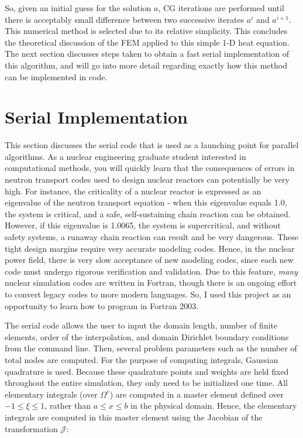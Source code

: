 \documentclass[10pt]{article}
\begin{document}
So, given an initial guess for the solution \(a\), CG iterations are performed until there is acceptably small difference between two successive iterates \(a^i\) and \(a^{i+1}\). This numerical method is selected due to its relative simplicity. This concludes the theoretical discussion of the FEM applied to this simple 1-D heat equation. The next section discusses steps taken to obtain a fast serial implementation of this algorithm, and will go into more detail regarding exactly how this method can be implemented in code.

\section{Serial Implementation}

This section discusses the serial code that is used as a launching point for parallel algorithms. As a nuclear engineering graduate student interested in computational methods, you will quickly learn that the consequences of errors in neutron transport codes used to design nuclear reactors can potentially be very high. For instance, the criticality of a nuclear reactor is expressed as an eigenvalue of the neutron transport equation - when this eigenvalue equals 1.0, the system is critical, and a safe, self-sustaining chain reaction can be obtained. However, if this eigenvalue is 1.0065, the system is supercritical, and without safety systems, a runaway chain reaction can result and be very dangerous. These tight design margins require very accurate modeling codes. Hence, in the nuclear power field, there is very slow acceptance of new modeling codes, since each new code must undergo rigorous verification and validation. Due to this feature, {\it many} nuclear simulation codes are written in Fortran, though there is an ongoing effort to convert legacy codes to more modern languages. So, I used this project as an opportunity to learn how to program in Fortran 2003. 

The serial code allows the user to input the domain length, number of finite elements, order of the interpolation, and domain Dirichlet boundary conditions from the command line. Then, several problem parameters such as the number of total nodes are computed. For the purpose of computing integrals, Gaussian quadrature is used. Because these quadrature points and weights are held fixed throughout the entire simulation, they only need to be initialized one time. All elementary integrals (over \(\Omega^e\)) are computed in a master element defined over \(-1\leq\xi\leq1\), rather than \(a\leq x\leq b\) in the physical domain. Hence, the elementary integrals are computed in this master element using the Jacobian of the transformation \(\mathscr{J}\):
\end{document}
